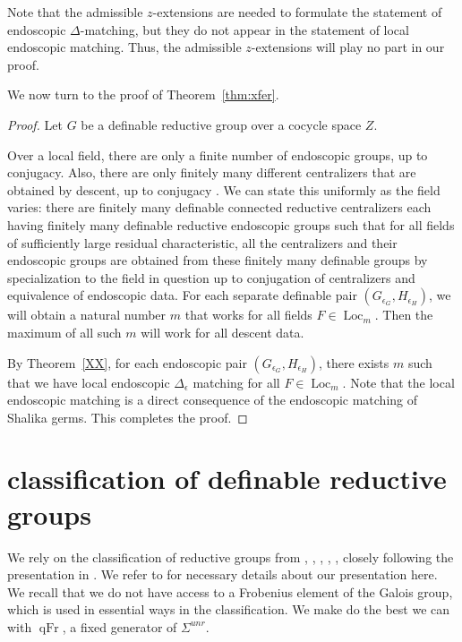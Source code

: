 \documentclass[12pt]{amsart}
\newcommand{\op}[1]{\operatorname{#1}}
\theoremstyle{plain}
\theoremstyle{definition}
\begin{document}
Note that the admissible $z$-extensions are needed to formulate the
statement of endoscopic $\Delta$-matching, but they do not appear in
the statement of local endoscopic matching.  Thus, the admissible
$z$-extensions will play no part in our proof.

We now turn to the proof of Theorem~\ref{thm:xfer}.

\begin{proof} Let $G$ be a definable reductive group over a cocycle
  space $Z$.

  Over a local field, there are only a finite number of endoscopic
  groups, up to conjugacy.  Also, there are only finitely many
  different centralizers that are obtained by descent, up to conjugacy
  \cite[Sec.2.2]{LSd}.  We can state this uniformly as the field
  varies: there are finitely many definable connected reductive
  centralizers each having finitely many definable reductive
  endoscopic groups such that for all fields of sufficiently large
  residual characteristic, all the centralizers and their endoscopic
  groups are obtained from these finitely many definable groups by
  specialization to the field in question up to conjugation of
  centralizers and equivalence of endoscopic data.  For each separate
  definable pair $(G_{\epsilon_G},H_{\epsilon_H})$, we will obtain a
  natural number $m$ that works for all fields $F\in \op{Loc}_m$.
  Then the maximum of all such $m$ will work for all descent data.

  By Theorem~\ref{XX}, for each endoscopic pair
  $(G_{\epsilon_G},H_{\epsilon_H})$, there exists $m$ such that we
  have local endoscopic $\Delta_\epsilon$ matching for all
  $F\in\op{Loc}_m$.  Note that the local endoscopic matching is
  a direct consequence of the endoscopic matching of Shalika germs.  This
  completes the proof.
\end{proof}


\section{classification of definable reductive groups}\label{sec:classification}

We rely on the classification of reductive groups from \cite{Gille},
\cite{Tits}, \cite{Sel}, \cite{Petrov}, \cite{reeder2010torsion}, closely following the
presentation in \cite{Gross}.  We refer to \cite{Gross} for necessary
details about our presentation here.  We recall that we do not have
access to a Frobenius element of the Galois group, which is used in
essential ways in the classification.  We make do the best we can with
$\op{qFr}$, a fixed generator of $\Sigma^{unr}$.
\end{document}
